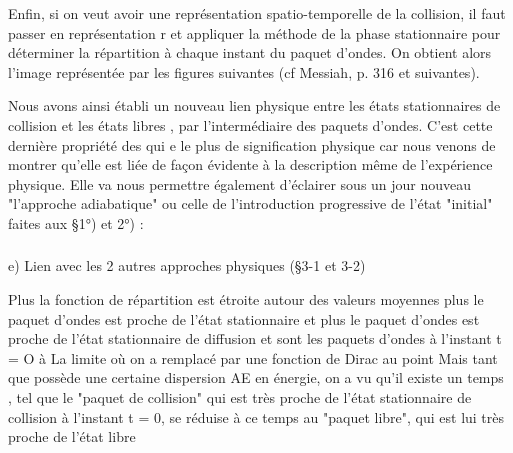 Enfin, si on veut avoir une représentation spatio-temporelle
de la collision, il faut passer en représentation r et appliquer la méthode de la
phase stationnaire pour déterminer la répartition à chaque
instant du paquet d'ondes. On obtient alors l'image représentée par les
figures suivantes (cf Messiah, p. 316 et suivantes).\begin{center}
 \end{center}\begin{center}
 \end{center}

Nous avons ainsi établi un nouveau lien physique entre les
états stationnaires de collision  et les états libres  , par
l'intermédiaire des paquets d'ondes. C'est cette dernière propriété des
 qui e le plus de signification physique car nous venons de montrer
qu'elle est liée de façon évidente à la description même de l'expérience
physique. Elle va nous permettre également d'éclairer sous un jour nouveau
"l'approche adiabatique" ou celle de l'introduction progressive de l'état
"initial" faites aux \S 1°) et 2°) :

\subsubsection{}%
e) Lien avec les 2 autres approches physiques (\S 3-1 et 3-2)

Plus la fonction de répartition  est étroite autour
des valeurs moyennes  plus le paquet d'ondes  est proche
de l'état stationnaire  et plus le paquet d'ondes  est proche
de l'état stationnaire de diffusion  et  sont les
paquets d'ondes à l'instant t = O à La limite où on a remplacé 
par une fonction de Dirac au point  Mais tant que  possède
une certaine dispersion AE en énergie, on a vu qu'il existe un temps
, tel que le "paquet de collision" qui est très proche de l'état
stationnaire de collision à l'instant t = 0, se réduise à ce temps au "paquet libre",
qui est lui très proche de l'état libre 

